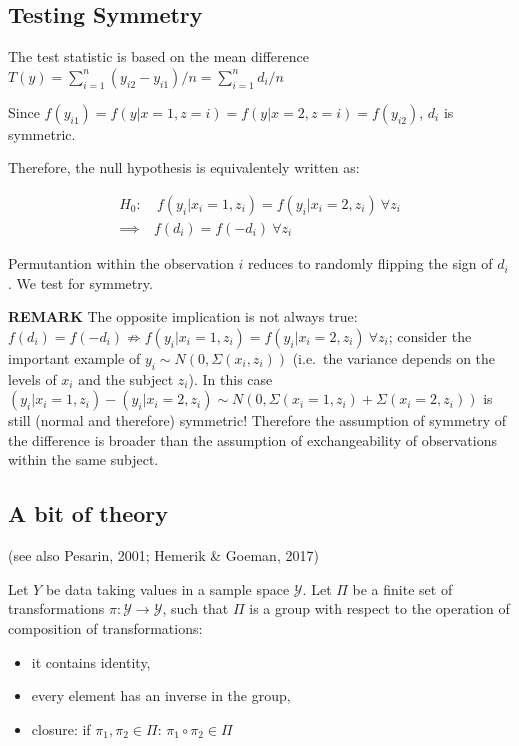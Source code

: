 \documentclass[
]{article}
\providecommand{\tightlist}{%
  \setlength{\itemsep}{0pt}\setlength{\parskip}{0pt}}
\begin{document}
\hypertarget{testing-symmetry}{%
\subsection{Testing Symmetry}\label{testing-symmetry}}

The test statistic is based on the mean difference
\(T(y)=\sum_{i=1}^n (y_{i2}-y_{i1})/n=\sum_{i=1}^n d_{i}/n\)

Since \(f(y_{i1})=f(y|x=1,z=i)=f(y|x=2,z=i)=f(y_{i2})\), \(d_{i}\) is
symmetric.

Therefore, the null hypothesis is equivalentely written as:

\[
\begin{aligned}
H_0:&\ f(y_i|x_i=1,z_i)=f(y_i|x_i=2,z_i) \ \forall z_i \\
\implies & f(d_i)=f(-d_i)\ \forall z_i
\end{aligned}
\]

Permutantion within the observation \(i\) reduces to randomly flipping
the sign of \(d_i\). We test for symmetry.

\textbf{REMARK} The opposite implication is not always true:
\(f(d_i)=f(-d_i) \nRightarrow f(y_i|x_i=1,z_i)=f(y_i|x_i=2,z_i) \ \forall z_i\);
consider the important example of \(y_i\sim N(0,\Sigma(x_i,z_i))\)
(i.e.~the variance depends on the levels of \(x_i\) and the subject
\(z_i\)). In this case
\((y_i|x_i=1,z_i)-(y_i|x_i=2,z_i)\sim N(0,\Sigma(x_i=1,z_i)+\Sigma(x_i=2,z_i))\)
is still (normal and therefore) symmetric! Therefore the assumption of
symmetry of the difference is broader than the assumption of
exchangeability of observations within the same subject.

\hypertarget{a-bit-of-theory}{%
\subsection{A bit of theory}\label{a-bit-of-theory}}

(see also Pesarin, 2001; Hemerik \& Goeman, 2017)

Let \(Y\) be data taking values in a sample space \(\mathcal{Y}\). Let
\(\Pi\) be a finite set of transformations
\(\pi : \mathcal{Y} \rightarrow \mathcal{Y}\), such that \(\Pi\) is a
group with respect to the operation of composition of transformations:

\begin{itemize}
\tightlist
\item
  it contains identity,
\item
  every element has an inverse in the group,
\item
  closure: if \(\pi_1,\pi_2\in\Pi\): \(\pi_1\circ\pi_2\in\Pi\)
\end{itemize}
\end{document}
